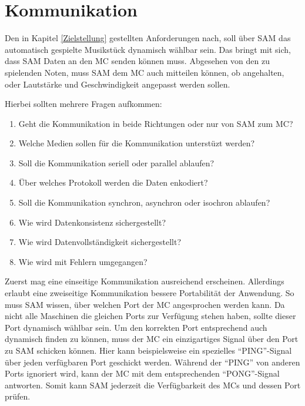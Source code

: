\section{Kommunikation} \label{vorgehenSW-SPPP}

Den in Kapitel \ref{Zielstellung} gestellten Anforderungen nach, soll über \ac{SAM} das automatisch gespielte Musikstück dynamisch wählbar sein.
Das bringt mit sich, dass \ac{SAM} Daten an den \ac{MC} senden können muss.
Abgesehen von den zu spielenden Noten, muss \ac{SAM} dem \ac{MC} auch mitteilen können, ob angehalten, oder Lautstärke und Geschwindigkeit angepasst werden sollen.

Hierbei sollten mehrere Fragen aufkommen:
\begin{enumerate}
    \item Geht die Kommunikation in beide Richtungen oder nur von \ac{SAM} zum \ac{MC}?
    \item Welche Medien sollen für die Kommunikation unterstüzt werden?
    \item Soll die Kommunikation seriell oder parallel ablaufen?
    \item Über welches Protokoll werden die Daten enkodiert?
    \item Soll die Kommunikation synchron, asynchron oder isochron ablaufen?
    \item Wie wird Datenkonsistenz sichergestellt?
    \item Wie wird Datenvollständigkeit sichergestellt?
    \item Wie wird mit Fehlern umgegangen?
\end{enumerate}

Zuerst mag eine einseitige Kommunikation ausreichend erscheinen.
Allerdings erlaubt eine zweiseitige Kommunikation bessere Portabilität der Anwendung.
So muss \ac{SAM} wissen, über welchen Port der \ac{MC} angesprochen werden kann.
Da nicht alle Maschinen die gleichen Ports zur Verfügung stehen haben, sollte dieser Port dynamisch wählbar sein.
Um den korrekten Port entsprechend auch dynamisch finden zu können, muss der \ac{MC} ein einzigartiges Signal über den Port zu \ac{SAM} schicken können.
Hier kann beispielsweise ein spezielles \enquote{PING}-Signal über jeden verfügbaren Port geschickt werden.
Während der \enquote{PING} von anderen Ports ignoriert wird, kann der \ac{MC} mit dem entsprechenden \enquote{PONG}-Signal antworten.
Somit kann \ac{SAM} jederzeit die Verfügbarkeit des \ac{MC}s und dessen Port prüfen.


